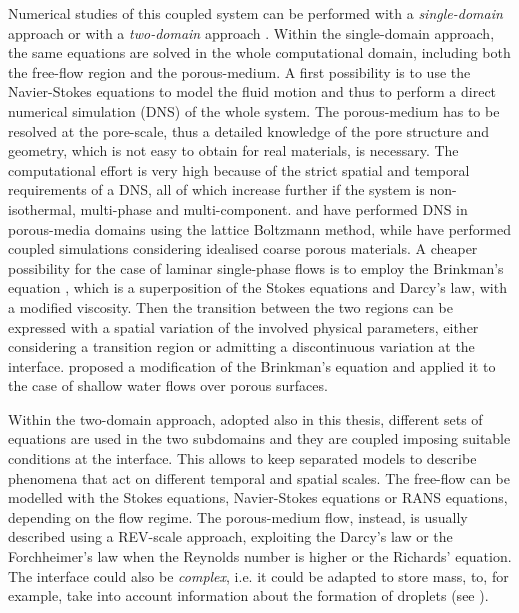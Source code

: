 Numerical studies of this coupled system can be performed with a 
\emph{single-domain} approach or with a \emph{two-domain} approach 
\cite{tesi:fetzer}.
Within the single-domain approach, the same equations are solved in the whole 
computational domain, including both the free-flow region and the 
porous-medium. A first possibility is to use the Navier-Stokes equations to model the 
fluid motion and thus to perform a direct numerical simulation (DNS) of the 
whole system. The porous-medium has to be resolved at the pore-scale, thus a 
detailed knowledge of the pore structure and geometry, which is not easy to obtain for real 
materials, is necessary. The computational effort is very high because 
of the strict spatial and temporal requirements of a DNS,
all of which increase further if the system
is non-isothermal, multi-phase and multi-component. \textcite{intro:dns} and \textcite{intro:dns2} have performed DNS in 
porous-media domains using the lattice Boltzmann method, while \textcite{intro:yang} have performed coupled simulations considering idealised coarse porous materials.
A cheaper possibility for the case of laminar single-phase flows is to employ the Brinkman's equation 
\cite{intro:brinkman}, which is a superposition of the Stokes equations and 
Darcy's law, with a modified viscosity. %
Then the transition between the two 
regions can be expressed with a spatial variation of the involved physical 
parameters, either considering a transition region or admitting a discontinuous 
variation at the interface. \textcite{intro:shavit} proposed a modification of 
the Brinkman's equation and applied it to the case of shallow water flows over 
porous surfaces.

Within the two-domain approach, adopted also in this thesis, different sets of 
equations are used in the two subdomains and they are coupled imposing suitable 
conditions at the interface. This allows to keep separated models to describe phenomena that act on different temporal and spatial scales. The free-flow can be modelled with the Stokes 
equations, Navier-Stokes equations or RANS equations, depending on the flow 
regime. The porous-medium flow, instead, is usually described using a REV-scale approach, exploiting the 
Darcy's law or the Forchheimer's law when the Reynolds number is higher or the 
Richards' equation. The interface could also be \emph{complex}, i.e. it could be 
adapted to store mass, to, for example, take into account information about the formation of droplets
(see \cite{tesi:baber}).

